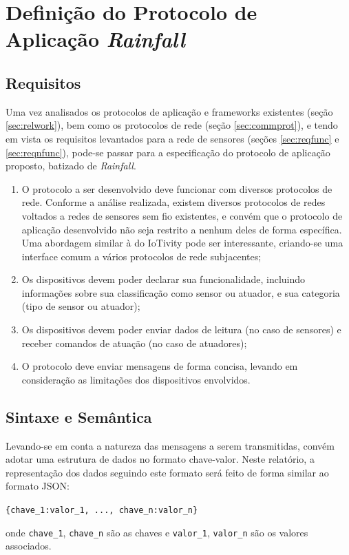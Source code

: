 
\section{Definição do Protocolo de Aplicação \textit{Rainfall}}
\subsection{Requisitos} \label{subsec:requisitos}
Uma vez analisados os protocolos de aplicação e frameworks existentes (seção \ref{sec:relwork}), bem como os protocolos de rede (seção \ref{sec:commprot}), e tendo em vista os requisitos levantados para a rede de sensores (seções \ref{sec:reqfunc} e \ref{sec:reqnfunc}), pode-se passar para a especificação do protocolo de aplicação proposto, batizado de \textit{Rainfall}.

\begin{enumerate}[\quad R1.]
	\item O protocolo a ser desenvolvido deve funcionar com diversos protocolos de rede. Conforme a análise realizada, existem diversos protocolos de redes voltados a redes de sensores sem fio existentes, e convém que o protocolo de aplicação desenvolvido não seja restrito a nenhum deles de forma específica. Uma abordagem similar à do IoTivity pode ser interessante, criando-se uma interface comum a vários protocolos de rede subjacentes;
	\item Os dispositivos devem poder declarar sua funcionalidade, incluindo informações sobre sua classificação como sensor ou atuador, e sua categoria (tipo de sensor ou atuador);
	\item Os dispositivos devem poder enviar dados de leitura (no caso de sensores) e receber comandos de atuação (no caso de atuadores);
	\item O protocolo deve enviar mensagens de forma concisa, levando em consideração as limitações dos dispositivos envolvidos.
\end{enumerate}

\subsection{Sintaxe e Semântica} \label{subsec:sintaxe}
Levando-se em conta a natureza das mensagens a serem transmitidas, convém adotar uma estrutura de dados no formato chave-valor. Neste relatório, a representação dos dados seguindo este formato será feito de forma similar ao formato JSON:
\begin{center}
	\texttt{\{chave\_1:valor\_1, ..., chave\_n:valor\_n\}}
\end{center}
onde \texttt{chave\_1}, \texttt{chave\_n} são as chaves e \texttt{valor\_1}, \texttt{valor\_n} são os valores associados.

